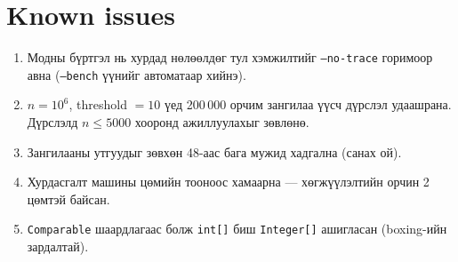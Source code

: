 \documentclass[11pt,a4paper]{article}
\begin{document}
\section{Known issues}

\begin{enumerate}[nosep,leftmargin=*]
  \item Модны бүртгэл нь хурдад нөлөөлдөг тул хэмжилтийг
        \texttt{--no-trace} горимоор авна (\texttt{--bench} үүнийг автоматаар хийнэ).
  \item $n = 10^6$, threshold $= 10$ үед 200\,000 орчим зангилаа үүсч
        дүрслэл удаашрана. Дүрслэлд $n \le 5000$ хооронд ажиллуулахыг зөвлөнө.
  \item Зангилааны утгуудыг зөвхөн 48-аас бага мужид хадгална (санах ой).
  \item Хурдасгалт машины цөмийн тооноос хамаарна --- хөгжүүлэлтийн орчин
        2 цөмтэй байсан.
  \item \texttt{Comparable} шаардлагаас болж \texttt{int[]} биш
        \texttt{Integer[]} ашигласан (boxing-ийн зардалтай).
\end{enumerate}
\end{document}
